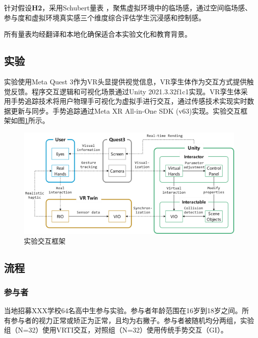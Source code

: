 \documentclass[runningheads]{llncs}
\begin{document}

针对假设\textbf{H2}，采用Schubert量表 \cite{schubert2001experience}，聚焦虚拟环境中的临场感，通过空间临场感、参与度和虚拟环境真实感三个维度综合评估学生沉浸感和控制感。

所有量表均经翻译和本地化确保适合本实验文化和教育背景。

\subsection{实验}
实验使用Meta Quest 3作为VR头显提供视觉信息，VR孪生体作为交互方式提供触觉反馈。程序交互逻辑和可视化场景通过Unity 2021.3.32f1c1实现。VR孪生体采用手势追踪技术将用户物理手可视化为虚拟手进行交互，通过传感技术实现实时数据更新与同步。手势追踪通过Meta XR All-in-One SDK (v63)实现。实验交互框架如图\ref{fig:system-framework-flowchart}所示。

\begin{figure}[t]
  \centering
  \includegraphics[width=1\textwidth]{image/system-framework-flowchart.pdf}
  \caption{实验交互框架}
  \label{fig:system-framework-flowchart}
\end{figure}

\subsection{流程}
\subsubsection{参与者}
当地招募XXX学校64名高中生参与实验。参与者年龄范围在16岁到18岁之间。所有参与者的视力正常或矫正为正常，且均为右撇子。参与者被随机均分两组，实验组（N=32）使用VRTI交互，对照组（N=32）使用传统手势交互（GI）。
\end{document}
